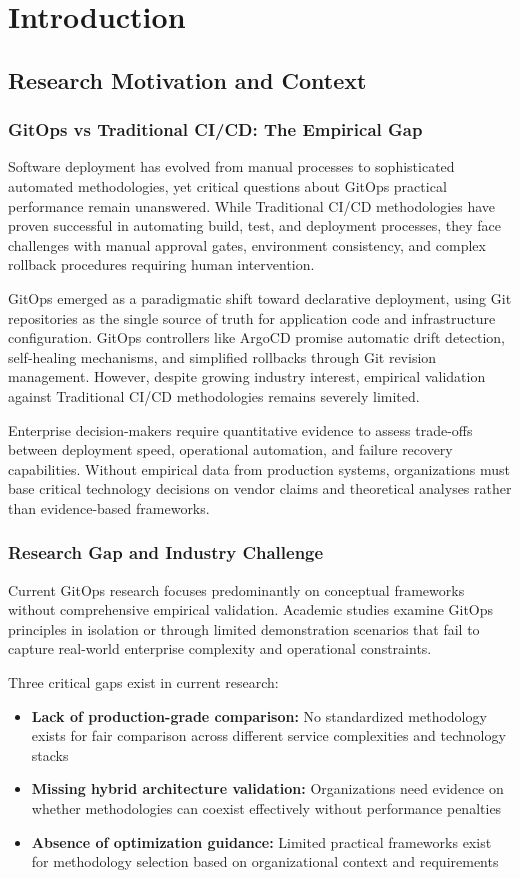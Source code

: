 \chapter{Introduction}

\section{Research Motivation and Context}

\subsection{GitOps vs Traditional CI/CD: The Empirical Gap}
Software deployment has evolved from manual processes to sophisticated automated methodologies, yet critical questions about GitOps practical performance remain unanswered. While Traditional CI/CD methodologies have proven successful in automating build, test, and deployment processes, they face challenges with manual approval gates, environment consistency, and complex rollback procedures requiring human intervention.

GitOps emerged as a paradigmatic shift toward declarative deployment, using Git repositories as the single source of truth for application code and infrastructure configuration. GitOps controllers like ArgoCD promise automatic drift detection, self-healing mechanisms, and simplified rollbacks through Git revision management. However, despite growing industry interest, empirical validation against Traditional CI/CD methodologies remains severely limited.

Enterprise decision-makers require quantitative evidence to assess trade-offs between deployment speed, operational automation, and failure recovery capabilities. Without empirical data from production systems, organizations must base critical technology decisions on vendor claims and theoretical analyses rather than evidence-based frameworks.

\subsection{Research Gap and Industry Challenge}
Current GitOps research focuses predominantly on conceptual frameworks without comprehensive empirical validation. Academic studies examine GitOps principles in isolation or through limited demonstration scenarios that fail to capture real-world enterprise complexity and operational constraints.

Three critical gaps exist in current research:
\begin{itemize}
\item \textbf{Lack of production-grade comparison:} No standardized methodology exists for fair comparison across different service complexities and technology stacks
\item \textbf{Missing hybrid architecture validation:} Organizations need evidence on whether methodologies can coexist effectively without performance penalties
\item \textbf{Absence of optimization guidance:} Limited practical frameworks exist for methodology selection based on organizational context and requirements
\end{itemize}

